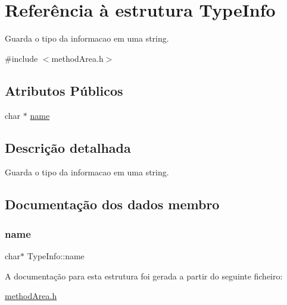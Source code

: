 \hypertarget{struct_type_info}{}\section{Referência à estrutura Type\+Info}
\label{struct_type_info}


Guarda o tipo da informacao em uma string.  




{\ttfamily \#include $<$method\+Area.\+h$>$}

\subsection*{Atributos Públicos}
\begin{DoxyCompactItemize}
\item 
char $\ast$ \hyperlink{struct_type_info_ac1577516ffc54df13b02b23bd50ed5b4}{name}
\end{DoxyCompactItemize}


\subsection{Descrição detalhada}
Guarda o tipo da informacao em uma string. 

\subsection{Documentação dos dados membro}
\mbox{\label{struct_type_info_ac1577516ffc54df13b02b23bd50ed5b4}} 
\subsubsection{\texorpdfstring{name}{name}}
{\footnotesize\ttfamily char$\ast$ Type\+Info\+::name}



A documentação para esta estrutura foi gerada a partir do seguinte ficheiro\+:\begin{DoxyCompactItemize}
\item 
\hyperlink{method_area_8h}{method\+Area.\+h}\end{DoxyCompactItemize}
